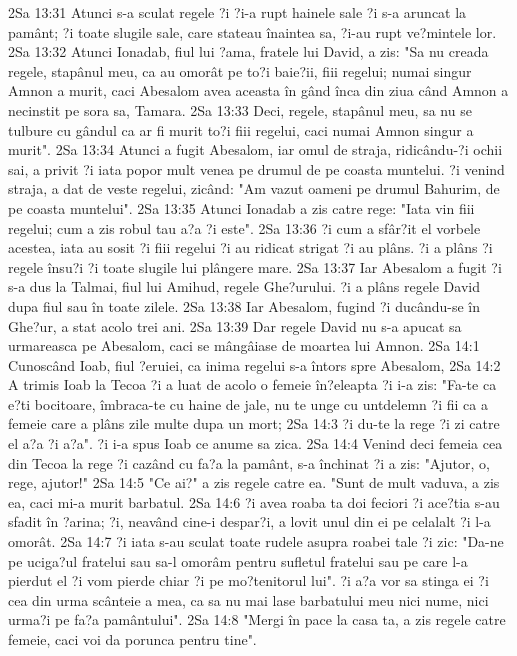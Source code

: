 2Sa 13:31  Atunci s-a sculat regele ?i ?i-a rupt hainele sale ?i s-a aruncat la pamânt; ?i toate slugile sale, care stateau înaintea sa, ?i-au rupt ve?mintele lor.
2Sa 13:32  Atunci Ionadab, fiul lui ?ama, fratele lui David, a zis: "Sa nu creada regele, stapânul meu, ca au omorât pe to?i baie?ii, fiii regelui; numai singur Amnon a murit, caci Abesalom avea aceasta în gând înca din ziua când Amnon a necinstit pe sora sa, Tamara.
2Sa 13:33  Deci, regele, stapânul meu, sa nu se tulbure cu gândul ca ar fi murit to?i fiii regelui, caci numai Amnon singur a murit".
2Sa 13:34  Atunci a fugit Abesalom, iar omul de straja, ridicându-?i ochii sai, a privit ?i iata popor mult venea pe drumul de pe coasta muntelui. ?i venind straja, a dat de veste regelui, zicând: "Am vazut oameni pe drumul Bahurim, de pe coasta muntelui".
2Sa 13:35  Atunci Ionadab a zis catre rege: "Iata vin fiii regelui; cum a zis robul tau a?a ?i este".
2Sa 13:36  ?i cum a sfâr?it el vorbele acestea, iata au sosit ?i fiii regelui ?i au ridicat strigat ?i au plâns. ?i a plâns ?i regele însu?i ?i toate slugile lui plângere mare.
2Sa 13:37  Iar Abesalom a fugit ?i s-a dus la Talmai, fiul lui Amihud, regele Ghe?urului. ?i a plâns regele David dupa fiul sau în toate zilele.
2Sa 13:38  Iar Abesalom, fugind ?i ducându-se în Ghe?ur, a stat acolo trei ani.
2Sa 13:39  Dar regele David nu s-a apucat sa urmareasca pe Abesalom, caci se mângâiase de moartea lui Amnon.
2Sa 14:1  Cunoscând Ioab, fiul ?eruiei, ca inima regelui s-a întors spre Abesalom,
2Sa 14:2  A trimis Ioab la Tecoa ?i a luat de acolo o femeie în?eleapta ?i i-a zis: "Fa-te ca e?ti bocitoare, îmbraca-te cu haine de jale, nu te unge cu untdelemn ?i fii ca a femeie care a plâns zile multe dupa un mort;
2Sa 14:3  ?i du-te la rege ?i zi catre el a?a ?i a?a". ?i i-a spus Ioab ce anume sa zica.
2Sa 14:4  Venind deci femeia cea din Tecoa la rege ?i cazând cu fa?a la pamânt, s-a închinat ?i a zis: "Ajutor, o, rege, ajutor!"
2Sa 14:5  "Ce ai?" a zis regele catre ea. "Sunt de mult vaduva, a zis ea, caci mi-a murit barbatul.
2Sa 14:6  ?i avea roaba ta doi feciori ?i ace?tia s-au sfadit în ?arina; ?i, neavând cine-i despar?i, a lovit unul din ei pe celalalt ?i l-a omorât.
2Sa 14:7  ?i iata s-au sculat toate rudele asupra roabei tale ?i zic: "Da-ne pe uciga?ul fratelui sau sa-l omorâm pentru sufletul fratelui sau pe care l-a pierdut el ?i vom pierde chiar ?i pe mo?tenitorul lui". ?i a?a vor sa stinga ei ?i cea din urma scânteie a mea, ca sa nu mai lase barbatului meu nici nume, nici urma?i pe fa?a pamântului".
2Sa 14:8  "Mergi în pace la casa ta, a zis regele catre femeie, caci voi da porunca pentru tine".
